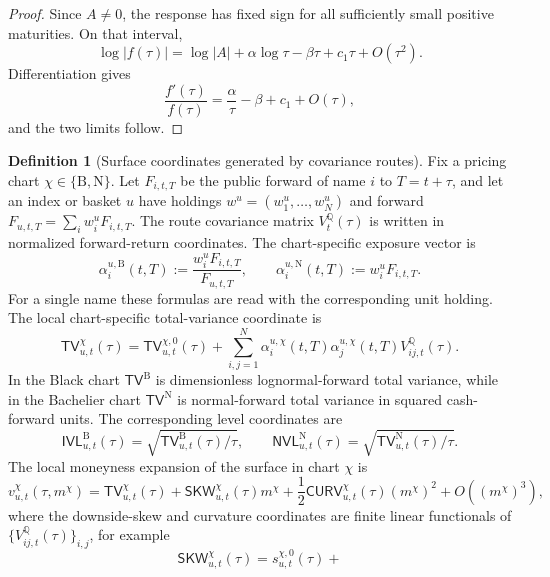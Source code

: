 \documentclass[11pt,a4paper]{amsart}
\theoremstyle{plain}
\theoremstyle{definition}
\newtheorem{definition}[theorem]{Definition}
\theoremstyle{remark}
\newcommand{\QQ}{\mathbb{Q}}
\begin{document}
\begin{proof}
Since \(A\ne0\), the response has fixed sign for all sufficiently small positive maturities.  On
that interval,
\[
        \log |f(\tau)|
        =
        \log |A|+\alpha\log\tau-\beta\tau+c_1\tau+O(\tau^2).
\]
Differentiation gives
\[
        \frac{f'(\tau)}{f(\tau)}
        =
        \frac{\alpha}{\tau}-\beta+c_1+O(\tau),
\]
and the two limits follow.
\end{proof}


\begin{definition}[Surface coordinates generated by covariance routes]\label{def:surface-functional-forms}
Fix a pricing chart \(\chi\in\{\mathrm B,\mathrm N\}\).  Let \(F_{i,t,T}\) be the public forward
of name \(i\) to \(T=t+\tau\), and let an index or basket \(u\) have holdings
\(w^u=(w_1^u,\dots,w_N^u)\) and forward \(F_{u,t,T}=\sum_iw_i^uF_{i,t,T}\).  The route covariance
matrix \(V_t^\QQ(\tau)\) is written in normalized forward-return coordinates.  The chart-specific
exposure vector is
\[
        \alpha_i^{u,\mathrm B}(t,T)
        :=
        \frac{w_i^uF_{i,t,T}}{F_{u,t,T}},
        \qquad
        \alpha_i^{u,\mathrm N}(t,T)
        :=
        w_i^uF_{i,t,T}.
\]
For a single name these formulas are read with the corresponding unit holding.  The local
chart-specific total-variance coordinate is
\[
        \mathsf{TV}_{u,t}^{\chi}(\tau)
        =
        \mathsf{TV}^{\chi,0}_{u,t}(\tau)
        +
        \sum_{i,j=1}^N
        \alpha_i^{u,\chi}(t,T)\alpha_j^{u,\chi}(t,T)
        V_{ij,t}^\QQ(\tau).
\]
In the Black chart \(\mathsf{TV}^{\mathrm B}\) is dimensionless lognormal-forward total
variance, while in the Bachelier chart \(\mathsf{TV}^{\mathrm N}\) is normal-forward total
variance in squared cash-forward units.  The corresponding level coordinates are
\[
        \mathsf{IVL}_{u,t}^{\mathrm B}(\tau)
        =
        \sqrt{\mathsf{TV}_{u,t}^{\mathrm B}(\tau)/\tau},
        \qquad
        \mathsf{NVL}_{u,t}^{\mathrm N}(\tau)
        =
        \sqrt{\mathsf{TV}_{u,t}^{\mathrm N}(\tau)/\tau}.
\]
The local moneyness expansion of the surface in chart \(\chi\) is
\[
        v_{u,t}^{\chi}(\tau,m^\chi)
        =
        \mathsf{TV}_{u,t}^{\chi}(\tau)
        +
        \mathsf{SKW}_{u,t}^{\chi}(\tau)m^\chi
        +
        \frac12\mathsf{CURV}_{u,t}^{\chi}(\tau)(m^\chi)^2
        +
        O((m^\chi)^3),
\]
where the downside-skew and curvature coordinates are finite linear functionals of
\(\{V_{ij,t}^\QQ(\tau)\}_{i,j}\), for example
\[
        \mathsf{SKW}_{u,t}^{\chi}(\tau)
        =
        s^{\chi,0}_{u,t}(\tau)
        +
\]
\end{definition}
\end{document}
